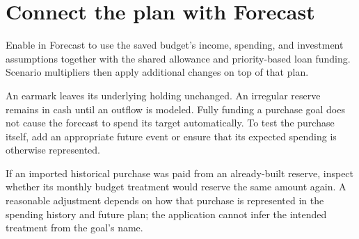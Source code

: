 \section{Connect the plan with Forecast}
Enable  in Forecast to use the saved budget's income, spending, and investment assumptions together with the shared allowance and priority-based loan funding. Scenario multipliers then apply additional changes on top of that plan.

An earmark leaves its underlying holding unchanged. An irregular reserve remains in cash until an outflow is modeled. Fully funding a purchase goal does not cause the forecast to spend its target automatically. To test the purchase itself, add an appropriate future event or ensure that its expected spending is otherwise represented.

If an imported historical purchase was paid from an already-built reserve, inspect whether its monthly budget treatment would reserve the same amount again. A reasonable adjustment depends on how that purchase is represented in the spending history and future plan; the application cannot infer the intended treatment from the goal's name.


